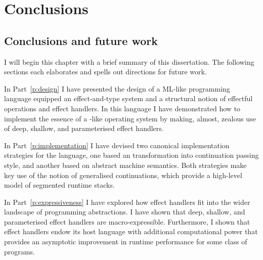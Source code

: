 \documentclass[12pt,phd,lfcs,twoside,openright,logo,leftchapter,normalheadings]{infthesis}
\theoremstyle{plain}
\theoremstyle{definition}
\begin{document}
\part{Conclusions}
\label{p:conclusions}

\chapter{Conclusions and future work}
\label{ch:conclusions}
%
I will begin this chapter with a brief summary of this
dissertation. The following sections each elaborates and spells out
directions for future work.


In Part~\ref{p:design} I have presented the design of a ML-like
programming language equipped an effect-and-type system and a
structural notion of effectful operations and effect handlers. In this
language I have demonstrated how to implement the essence of a
\UNIX{}-like operating system by making, almost, zealous use of deep,
shallow, and parameterised effect handlers.

In Part~\ref{p:implementation} I have devised two canonical
implementation strategies for the language, one based an
transformation into continuation passing style, and another based on
abstract machine semantics. Both strategies make key use of the notion
of generalised continuations, which provide a high-level model of
segmented runtime stacks.

In Part~\ref{p:expressiveness} I have explored how effect handlers fit
into the wider landscape of programming abstractions. I have shown
that deep, shallow, and parameterised effect handlers are
macro-expressible. Furthermore, I shown that effect handlers endow its
host language with additional computational power that provides an
asymptotic improvement in runtime performance for some class of
programs.
\end{document}
